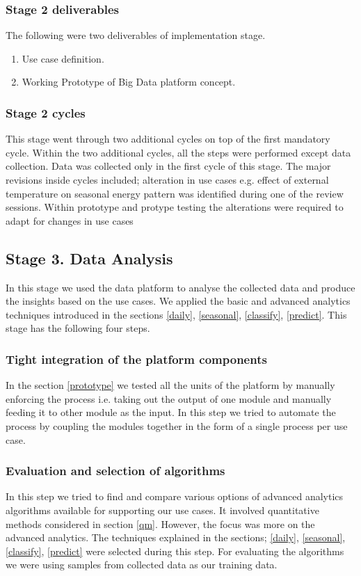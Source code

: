 \subsubsection{Stage 2 deliverables}
The following were two deliverables of implementation stage.
\begin{enumerate}
\item Use case definition.
\item Working Prototype of Big Data platform concept.
\end{enumerate}
\subsubsection{Stage 2 cycles}
This stage went through two additional cycles on top of the first mandatory cycle. Within the two additional cycles, all the steps were performed except data collection. Data was collected only in the first cycle of this stage. 
The major revisions inside cycles included; alteration in use cases e.g. effect of external temperature on seasonal energy pattern was identified during one of the review sessions. Within prototype and protype testing the alterations were required to adapt for changes in use cases

\subsection{Stage 3. Data Analysis}
In this stage we used the data platform to analyse the collected data and produce the insights based on the use cases. We applied the basic and advanced analytics techniques introduced in the sections  \ref{daily}, \ref{seasonal}, \ref{classify}, \ref{predict}. This stage has the following four steps.
\subsubsection{Tight integration of the platform components}
In the section \ref{prototype} we tested all the units of the platform by manually enforcing the process i.e. taking out the  output of one module and manually feeding it to other module as the input. In this step we tried to automate the process by coupling the modules together in the form of a single process per use case. 
\subsubsection{Evaluation and selection of algorithms}\label{eval}
In this step we tried to find and compare various options of advanced analytics algorithms available for supporting our use cases. It involved quantitative methods considered in section \ref{qm}. However, the focus was more on the advanced analytics. The techniques explained in the sections; \ref{daily}, \ref{seasonal},  \ref{classify}, \ref{predict} were selected during this step. For evaluating the algorithms we were using samples from collected data as our training data. 
